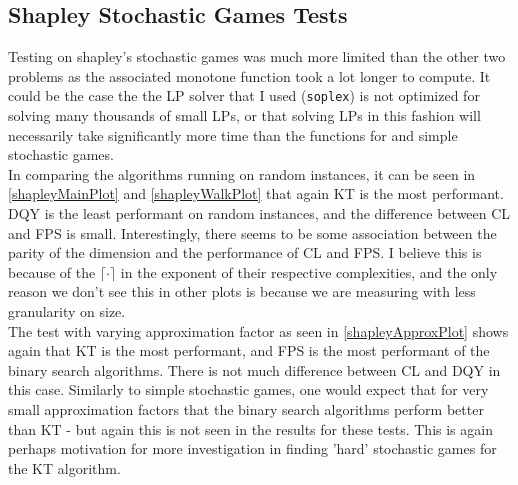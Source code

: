 \subsection{Shapley Stochastic Games Tests}
Testing on shapley's stochastic games was much more limited than the other two problems
as the associated monotone function took a lot longer to compute. It could be the case
the the LP solver that I used (\lstinline{soplex}) is not optimized for solving
many thousands of small LPs, or that solving LPs in this fashion will necessarily
take significantly more time than the functions for \arr and simple stochastic games. \\
In comparing the algorithms running on random instances, it can be seen in \cref{shapleyMainPlot}
and \cref{shapleyWalkPlot} that 
again KT is the most performant. DQY is the least performant on random instances, and the difference
between CL and FPS is small. Interestingly, there seems to be some association between
the parity of the dimension and the performance of CL and FPS. I believe this is because of the 
$\lceil \cdot \rceil$ in the exponent of their respective complexities, and the only reason
we don't see this in other plots is because we are measuring with less granularity on size. \\
The test with varying approximation factor as seen in \cref{shapleyApproxPlot} shows
again that KT is the most performant, and FPS is the most performant of the binary search algorithms.
There is not much difference between CL and DQY in this case. Similarly to simple stochastic games,
one would expect that for very small approximation factors that the binary search algorithms
perform better than KT - but again this is not seen in the results for these tests. This is again
perhaps motivation for more investigation in finding 'hard' stochastic games for the KT algorithm.

